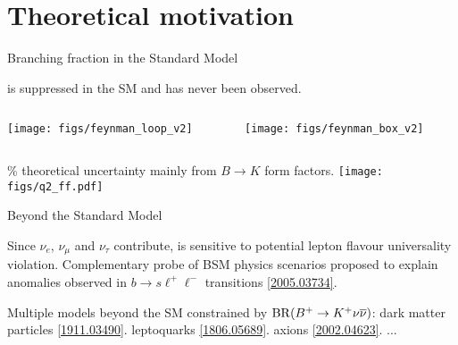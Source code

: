 \section{Theoretical motivation}
\begin{frame}{Branching fraction in the Standard Model}
\bi
\item \BKnn is suppressed in the SM and has never been observed. 
\ei
\vspace{0.1cm}
\begin{columns}
\begin{column}{0.5\linewidth} 
\centering
\texttt{[image: figs/feynman\_loop\_v2]}
\end{column}
\begin{column}{0.5\linewidth}
\centering
\texttt{[image: figs/feynman\_box\_v2]}
\end{column}
\end{columns}
\bi
{}
\% theoretical uncertainty mainly from $B\to K$ form factors.
\ei
\vspace{0.1cm}
\centering
\texttt{[image: figs/q2\_ff.pdf]}
\end{frame}
\begin{frame}{Beyond the Standard Model}
\bi
\item Since $\nu_e$, $\nu_\mu$ and $\nu_\tau$ contribute, \BKnn is sensitive to potential lepton flavour universality violation.
\itemi Complementary probe of BSM physics scenarios proposed to explain anomalies observed in $b\to s\ell^+\ell^-$ transitions \href{https://arxiv.org/pdf/2005.03734.pdf}{\color{blue!40!gray} [2005.03734]}. 

\itemi Multiple models beyond the SM constrained by $\mathrm{BR}(B^+\rightarrow K^+\nu{\overline{\nu}})$:
\bi
\itemii dark matter particles \hfill \href{https://arxiv.org/pdf/1911.03490.pdf}{\color{blue!40!gray} [1911.03490]}.
\itemii leptoquarks \hfill \href{https://arxiv.org/pdf/1806.05689.pdf}{\color{blue!40!gray} [1806.05689]}.
\itemii axions \hfill \href{https://arxiv.org/pdf/2002.04623.pdf}{\color{blue!40!gray} [2002.04623]}.
\itemii ... 
\ei
\ei
\end{frame}
